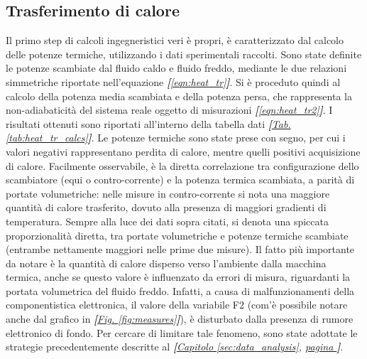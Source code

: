 \documentclass[a4paper,10pt]{article}                                                                                       %
\begin{document}
\subsection{Trasferimento di calore}                                                                                        %
\label{subsec:heat_tr}                                                                                                      %
  Il primo step di calcoli ingegneristici veri è propri, è caratterizzato dal calcolo delle potenze termiche, utilizzando i
  dati sperimentali raccolti. Sono state definite le potenze scambiate dal fluido caldo e fluido freddo, mediante le
  due relazioni simmetriche riportate nell'equazione \textit{\textbf{[}\ref{eqn:heat_tr}\textbf{]}}. Si è proceduto quindi
  al calcolo della potenza media scambiata e della potenza persa, che rappresenta la non-adiabaticità del
  sistema reale oggetto di misurazioni \textit{\textbf{[}\ref{eqn:heat_tr2}\textbf{]}}. I risultati ottenuti sono riportati
  all'interno della tabella dati \textit{\textbf{[}\hyperref[tab:heat_tr_calcs]{Tab. }\ref{tab:heat_tr_calcs}\textbf{]}}.
  Le potenze termiche sono state prese con segno, per cui i valori negativi rappresentano perdita di calore, mentre quelli
  positivi acquisizione di calore. Facilmente osservabile, è la diretta correlazione tra configurazione dello scambiatore
  (equi o contro-corrente) e la potenza termica scambiata, a parità di portate volumetriche: nelle misure in
  contro-corrente si nota una maggiore quantità di calore trasferito, dovuto alla presenza di maggiori gradienti di
  temperatura. Sempre alla luce dei dati sopra citati, si denota una spiccata proporzionalità diretta, tra portate
  volumetriche e potenze termiche scambiate (entrambe nettamente maggiori nelle prime due misure). Il fatto più importante
  da notare è la quantità di calore disperso verso l'ambiente dalla macchina termica, anche se questo valore è influenzato
  da errori di misura, riguardanti la portata volumetrica del fluido freddo. Infatti, a causa di malfunzionamenti della
  componentistica elettronica, il valore della variabile F2 (com'è possibile notare anche dal grafico in
  \textit{\textbf{[}\hyperref[fig:measures]{Fig. }\ref{fig:measures}\textbf{]}}), è disturbato dalla presenza
  di rumore elettronico di fondo. Per cercare di limitare tale fenomeno, sono state adottate le strategie precedentemente
  descritte al \textit{\textbf{[}\hyperref[sec:data_analysis]{Capitolo }\ref{sec:data_analysis},
  \hyperref[sec:data_analysis]{pagina }\pageref{sec:data_analysis}\textbf{]}}.
  \clearpage                                                                                                                %
\end{document}
